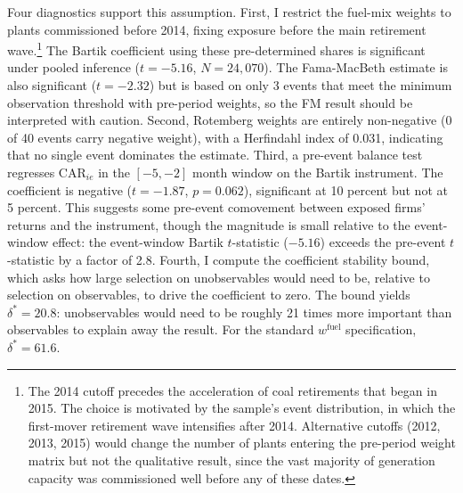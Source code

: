 \documentclass[12pt,a4paper]{article}
\begin{document}
Four diagnostics support this assumption. First, I restrict the fuel-mix weights to plants commissioned before 2014, fixing exposure before the main retirement wave.\footnote{The 2014 cutoff precedes the acceleration of coal retirements that began in 2015. The choice is motivated by the sample's event distribution, in which the first-mover retirement wave intensifies after 2014. Alternative cutoffs (2012, 2013, 2015) would change the number of plants entering the pre-period weight matrix but not the qualitative result, since the vast majority of generation capacity was commissioned well before any of these dates.} The Bartik coefficient using these pre-determined shares is significant under pooled inference ($t = -5.16$, $N = 24{,}070$). The Fama-MacBeth estimate is also significant ($t = -2.32$) but is based on only 3 events that meet the minimum observation threshold with pre-period weights, so the FM result should be interpreted with caution. Second, Rotemberg weights are entirely non-negative (0 of 40 events carry negative weight), with a Herfindahl index of 0.031, indicating that no single event dominates the estimate. Third, a pre-event balance test regresses $\text{CAR}_{ie}$ in the $[-5, -2]$ month window on the Bartik instrument. The coefficient is negative ($t = -1.87$, $p = 0.062$), significant at 10 percent but not at 5 percent. This suggests some pre-event comovement between exposed firms' returns and the instrument, though the magnitude is small relative to the event-window effect: the event-window Bartik $t$-statistic ($-5.16$) exceeds the pre-event $t$-statistic by a factor of 2.8. Fourth, I compute the \citet{Oster2019} coefficient stability bound, which asks how large selection on unobservables would need to be, relative to selection on observables, to drive the coefficient to zero. The bound yields $\delta^* = 20.8$: unobservables would need to be roughly 21 times more important than observables to explain away the result. For the standard $w^{\text{fuel}}$ specification, $\delta^* = 61.6$.
\end{document}
